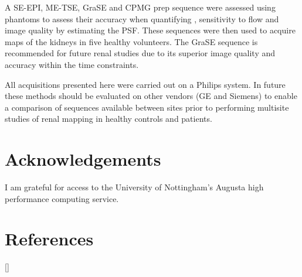 A \ac{SE}-\ac{EPI}, \ac{ME-TSE}, \ac{GraSE} and \ac{CPMG} \ttwo prep sequence were assessed using phantoms to assess their accuracy when quantifying \ttwo, sensitivity to flow and image quality by estimating the \ac{PSF}. These sequences were then used to acquire \ttwo maps of the kidneys in five healthy volunteers. The \ac{GraSE} sequence is recommended for future renal studies due to its superior image quality and accuracy within the time constraints.

All acquisitions presented here were carried out on a Philips system. In future these methods should be evaluated on other vendors (GE and Siemens) to enable a comparison of sequences available between sites prior to performing multisite studies of renal \ttwo mapping in healthy controls and patients.

\section{Acknowledgements}

I am grateful for access to the University of Nottingham's Augusta high performance computing service.

\newpage
\section{References}
[\refname]{}
\printbibliography